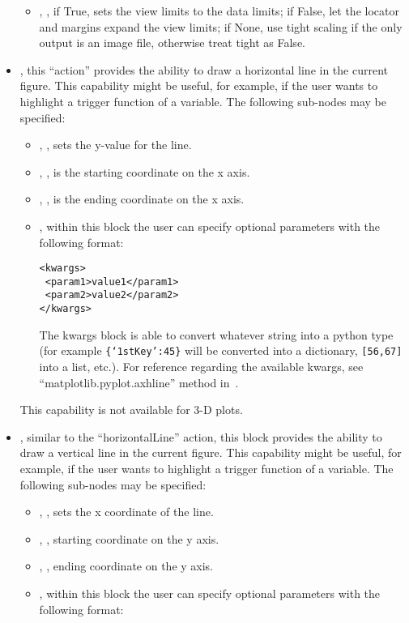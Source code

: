 \begin{itemize}
\begin{itemize}
    \item {}, , if True, sets the view
    limits to the data limits; if False, let the locator and margins expand the
    view limits; if None, use tight scaling if the only output is an image file,
    otherwise treat tight as False.
  \end{itemize}
  \item {}, this ``action'' provides the ability to draw
  a horizontal line in the current figure.
  This capability might be useful, for example, if the user wants to highlight a
  trigger function of a variable.
  The following sub-nodes may be specified:
  \begin{itemize}
    \item {}, , sets the y-value for the
    line.
    \item {}, , is the starting
    coordinate on the x axis.
    \item {}, , is the ending coordinate
    on the x axis.
    \item {}, within this block the user can specify optional
    parameters with the following format:

\begin{lstlisting}[style=XML]
<kwargs>
 <param1>value1</param1>
 <param2>value2</param2>
</kwargs>
\end{lstlisting}

  The kwargs block is able to convert whatever string into a python type (for
  example \texttt{\{`1stKey':45\}} will
  be converted into a dictionary,
  \texttt{[56,67]} into a list, etc.).
    For reference regarding the available kwargs, see
    ``matplotlib.pyplot.axhline'' method in~\cite{MatPlotLib}.
  \end{itemize}
  \nb This capability is not available for 3-D plots.
  \item {}, similar to the ``horizontalLine'' action,
  this block provides the ability to draw a vertical line in the current figure.
  This capability might be useful, for example, if the user wants to highlight a
  trigger function of a variable.
  The following sub-nodes may be specified:
  \begin{itemize}
    \item {}, , sets the x coordinate of the
    line.
    \item {}, , starting coordinate on
    the y axis.
    \item {}, , ending coordinate on the
    y axis.
    \item {}, within this block the user can specify optional
    parameters with the following format:


\end{itemize}
\end{itemize}
